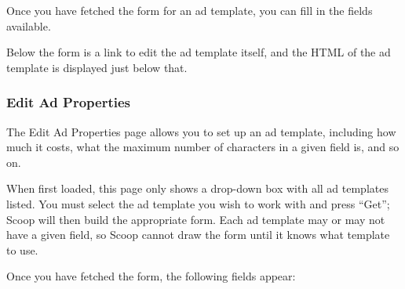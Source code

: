 Once you have fetched the form for an ad template, you can fill in the fields available.

Below the form is a link to edit the ad template itself, and the HTML of the ad template is displayed just below that.

\subsubsection{Edit Ad Properties}

The Edit Ad Properties page allows you to set up an ad template, including how much it costs, what the maximum number of characters in a given field is, and so on.

When first loaded, this page only shows a drop-down box with all ad templates listed.  You must select the ad template you wish to work with and press ``Get''; Scoop will then build the appropriate form.  Each ad template may or may not have a given field, so Scoop cannot draw the form until it knows what template to use.

Once you have fetched the form, the following fields appear:

